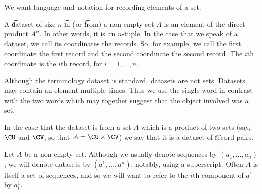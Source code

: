 

We want language and notation for recording elements of a set.


A \t{dataset} of size $n$ \t{in} (or \t{from}) a non-empty set $A$ is an element of the direct product $A^n$.
In other words, it is an $n$-tuple.
In the case that we speak of a dataset, we call its coordinates the records.
So, for example, we call the first coordinate the first record and the second coordinate the second record.
The $i$th coordinate is the $i$th record, for $i = 1, \dots, n$.

Although the terminology dataset is standard, datasets are not sets.
Datasets may contain an element multiple times.
Thus we use the single word  in contrast with the two words  which may together suggest that the object involved was a set.

In the case that the dataset is from a set $A$ which is a product of two sets (say, $\CU$ and $\CV$, so that $A = \CU \times \CV$) we say that it is a dataset of \t{record pairs}.


Let $A$ be a non-empty set.
Although we usually denote sequences by $(a_1, \dots, a_n)$, we will denote datasets by $(a^1, \dots, a^n)$; notably, using a superscript.
Often $A$ is itself a set of sequences, and so we will want to refer to the $i$th component of $a^1$ by $a^1_i$.

\blankpage
